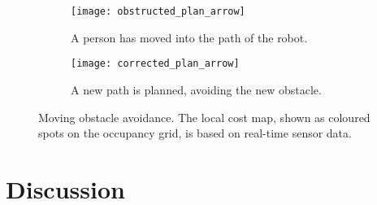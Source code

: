 \begin{figure}
	\centering
	\begin{subfigure}[b]{0.46\textwidth}
		\texttt{[image: obstructed\_plan\_arrow]}
		\caption{A person has moved into the path of the robot.}
		\label{fig:obstructed_plan}
	\end{subfigure}
	\begin{subfigure}[b]{0.472\textwidth}
		\texttt{[image: corrected\_plan\_arrow]}
		\caption{A new path is planned, avoiding the new obstacle.}
		\label{fig:corrected_plan}
	\end{subfigure}
	\caption{Moving obstacle avoidance. The local cost map, shown as coloured spots on the occupancy grid, is based on real-time sensor data. }\label{fig:obstacle_avoidance}
\end{figure}




\section{Discussion}